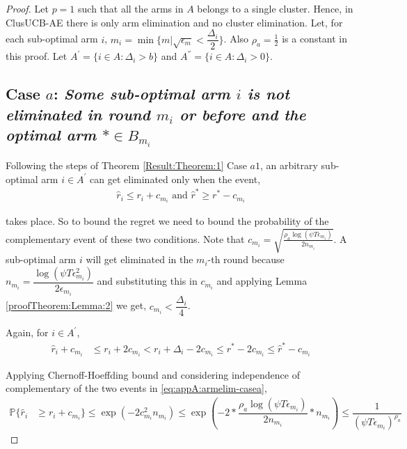 \begin{proof}
Let $p=1$ such that all the arms in $A$ belongs to a single cluster. Hence, in ClusUCB-AE there is only arm elimination and no cluster elimination. Let, for each sub-optimal arm ${i}$, $m_{i}=\min{\lbrace m|\sqrt{\epsilon_{m}} < \dfrac{\Delta_{i}}{2} \rbrace}$. Also $\rho_{a}=\frac{1}{2}$ is a constant in this proof. Let $A^{'}=\lbrace i\in A: \Delta_{i} > b \rbrace$ and $A^{''}=\lbrace i\in A: \Delta_{i} > 0 \rbrace$. 


\subsection*{Case $a$: \textit{Some sub-optimal arm ${i}$ is not eliminated in round $m_{i}$ or before and the optimal arm ${*}\in B_{m_{i}}$}}
  
	Following the steps of Theorem \ref{Result:Theorem:1} Case $a1$, an arbitrary sub-optimal arm ${i}\in A^{'}$ can get eliminated only when the event,
	\begin{align}
	\hat{r}_{i}  \le r_{i} + c_{m_i} \text{ and } \label{eq:appA:armelim-casea}
 	\hat{r}^{*}\geq  r^{*} - c_{m_i}
	\end{align}
	
	takes place. So to bound the regret we need to bound the probability of the complementary event of these two conditions. Note that  $c_{m_{i}} = \sqrt{\frac{\rho_{a}\log (\psi T\epsilon_{m_{i}})}{2 n_{m_i}}}$. A sub-optimal arm $i$ will get eliminated in the $m_i$-th round because $n_{m_{i}}=\dfrac{\log{(\psi T\epsilon_{m_{i}}^{2})}}{2\epsilon_{m_{i}}}$ and substituting this in $c_{m_i}$ and applying Lemma \ref{proofTheorem:Lemma:2} we get, $c_{m_i} < \dfrac{\Delta_{i}}{4} $.

  Again, for ${i} \in A^{'}$, 
  \begin{align*}
\hat{r}_{i} + c_{m_i}&\leq r_{i} + 2c_{m_i} 
 < r_{i} + \Delta_{i} - 2c_{m_i}
 \leq r^{*} -2c_{m_i} 
 \leq \hat{r}^{*} - c_{m_i}
  \end{align*}

	Applying Chernoff-Hoeffding bound and considering independence of complementary of the two events in \ref{eq:appA:armelim-casea},
  \begin{align*}
\mathbb{P}\lbrace\hat{r}_{i}&\geq r_{i} + c_{m_i}\rbrace\leq \exp(-2c_{m_i}^{2}n_{m_{i}})
\leq \exp(-2 * \dfrac{\rho_{a}\log (\psi T\epsilon_{m_{i}})}{2 n_{m_{i}}} *n_{m_{i}})
\leq \dfrac{1}{(\psi T\epsilon_{m_{i}})^{\rho_{a}}}   
  \end{align*}
 

\end{proof}

